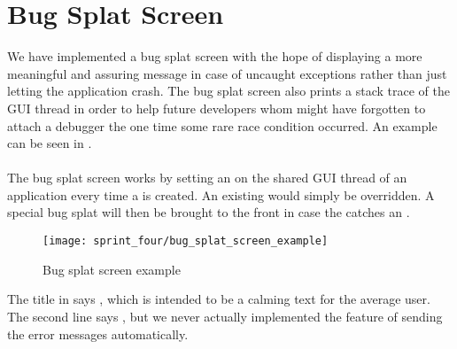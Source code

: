 
\section{Bug Splat Screen}
\label{sec:bug_splat_screen}

We have implemented a bug splat screen with the hope of displaying a more meaningful and assuring message in case of uncaught exceptions rather than just letting the application crash. The bug splat screen also prints a stack trace of the GUI thread in order to help future developers whom might have forgotten to attach a debugger the one time some rare race condition occurred. An example can be seen in .
\\\\
The bug splat screen works by setting an  on the shared GUI thread of an application every time a  is created. An existing  would simply be overridden. A special bug splat  will then be brought to the front in case the  catches an .

\begin{figure}[!htbp]
        \centering
        \texttt{[image: sprint\_four/bug\_splat\_screen\_example]}
        \caption{Bug splat screen example}
        \label{fig:bug_splat_screen_example}
\end{figure}

The title in  says , which is intended to be a calming text for the average user. The second line says , but we never actually implemented the feature of sending the error messages automatically.

